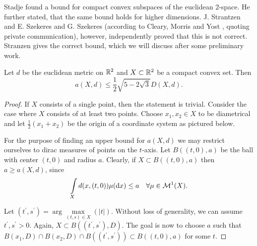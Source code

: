 Stadje \cite{stadje} found a bound for compact convex subspaces of the euclidean 2-space. He further stated, that the same bound holds for higher dimensions. J. Strantzen \cite{strantzen} and E. Szekeres and G. Szekeres (according to Cleary, Morris and Yost \cite{cleary:numbers-of-shapes}, quoting private communication), however, independently proved that this is not correct. Stranzen gives the correct bound, which we will discuss after some preliminary work.

\begin{theorem}
	Let $d$ be the euclidean metric on $\mathbb{R}^2$ and $X\subset \mathbb{R}^2$ be a compact convex set. Then \[
	a(X,d)\leq \frac{1}{2}\sqrt{5-2\sqrt{3}}D(X,d).
	\]
\end{theorem}
\begin{proof}
	If $X$ consists of a single point, then the statement is trivial. Consider the case where $X$ consists of at least two points. Choose $x_1,x_2\in X$ to be diametrical and let $\frac{1}{2}(x_1+x_2)$ be the origin of a coordinate system as pictured below.
	
	\begin{centering}
	
	\end{centering}
	
	For the purpose of finding an upper bound for $a(X,d)$ we may restrict ourselves to dirac measures of points on the $t$-axis. Let $B((t,0),a)$ be the ball with center $(t,0)$ and radius $a$. Clearly, if $X\subset B((t,0),a)$ then $a\geq a(X,d)$, since \[\int\limits_X d(x,(t,0))\mu(\mathrm{d}x)\leq a\quad \forall \mu\in \mathcal{M}^1(X).\] 
	
	Let $(t^\prime,s^\prime)=\arg\max\limits_{(t,s)\in X}(|t|)$. Without loss of generality, we can assume $t^\prime,s^\prime>0$. Again, $X\subset B((t^\prime,s^\prime),D)$. The goal is now to choose $a$ such that $B(x_1,D)\cap B(x_2,D)\cap B((t^\prime,s^\prime))\subset B((t,0),a)$ for some $t$.
	

\end{proof}

